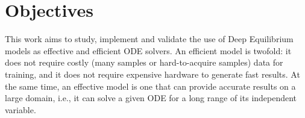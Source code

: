 




\section{Objectives}

This work aims to study, implement and validate the use of Deep Equilibrium models as effective and efficient \gls{ODE} solvers.
An efficient model is twofold: it does not require costly (many samples or hard-to-acquire samples) data for training, and it does not require expensive hardware to generate fast results.
At the same time, an effective model is one that can provide accurate results on a large domain, i.e., it can solve a given \gls{ODE} for a long range of its independent variable.

